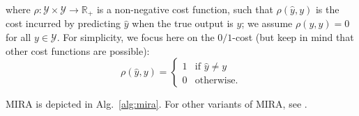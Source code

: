 where $\rho: \mathcal{Y} \times \mathcal{Y} \rightarrow \mathbb{R}_+$ is a non-negative cost function, 
such that $\rho(\hat{y},y)$ is the cost incurred by predicting $\hat{y}$ when the true output is $y$; 
we assume $\rho(y,y) = 0$ for all $y \in \mathcal{Y}$. 
For simplicity, we focus here on the $0/1$-cost (but keep in mind that other cost functions are possible): 
\begin{equation}\label{eq:costfunc}
\rho(\hat{y},y) = \left\{
\begin{array}{ll}
1 & \text{if $\hat{y} \ne y$}\\
0 & \text{otherwise.}
\end{array}
\right.
\end{equation}

MIRA is depicted in Alg.~\ref{alg:mira}. For other variants of MIRA, see \citet{Crammer2006}.  


